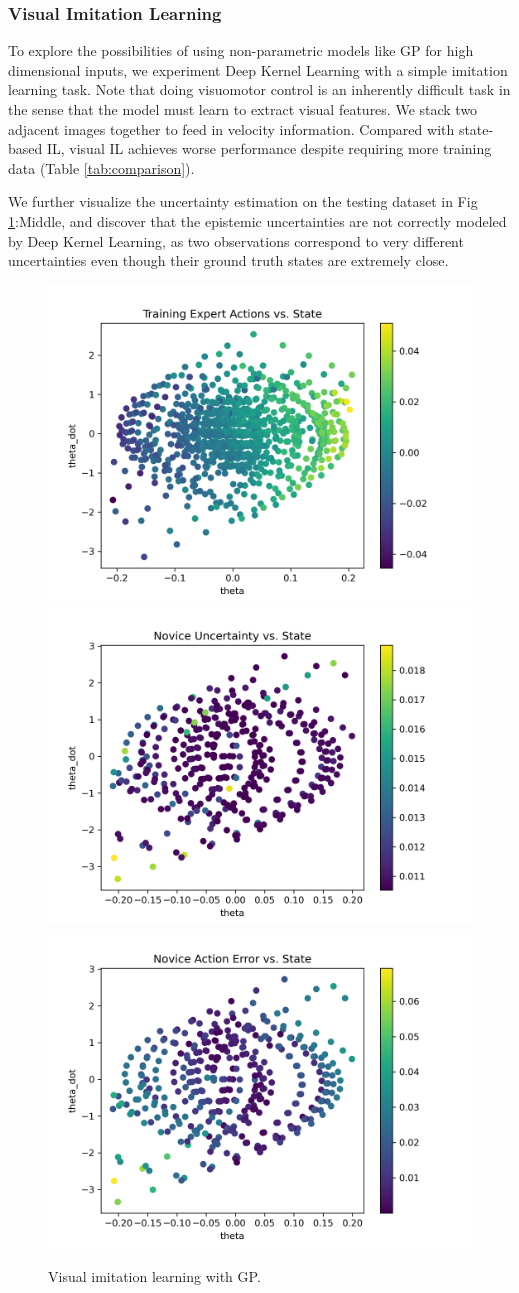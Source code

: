 \documentclass[11pt, reqno, letterpaper, twoside]{amsart}
\begin{document}
\subsubsection{Visual Imitation Learning} \label{vis-il} To explore the
possibilities of using non-parametric models like GP for high dimensional
inputs, we experiment Deep Kernel Learning with a simple imitation learning
task. Note that doing visuomotor control is an inherently difficult task in the
sense that the model must learn to extract visual features. We stack two
adjacent images together to feed in velocity information. Compared with
state-based IL, visual IL  achieves worse performance despite requiring more
training data (Table \ref{tab:comparison}).

We further visualize the uncertainty estimation on the testing dataset in Fig
\ref{fig:visual-il}:Middle, and discover that the epistemic uncertainties are
not correctly modeled by Deep Kernel Learning, as two observations correspond to
very different uncertainties even though their ground truth states are extremely
close.

\begin{figure}[ht]
	\centering
	\includegraphics[width=0.32\linewidth]{imgs/expert_data_0.png}
	\includegraphics[width=0.32\linewidth]{imgs/novice_uncertainty_0.png}
	\includegraphics[width=0.32\linewidth]{imgs/novice_error_0.png}
	\caption{Visual imitation learning with GP.}
	\label{fig:visual-il}
\end{figure}
\end{document}
